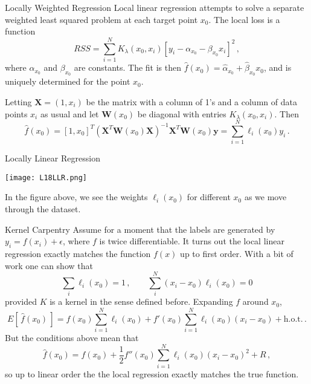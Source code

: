\documentclass[10pt, table, dvipsnames,xcdraw,handout]{beamer}
\newcommand{\bfX}{\ensuremath{\mathbf{X}}}
\newcommand{\bfy}{\ensuremath{\mathbf{y}}}
\begin{document}
\begin{frame}[fragile]{Locally Weighted Regression}
Local linear regression attempts to solve a separate weighted least squared problem at each target point $x_0$. The local loss is a function
$$
RSS = \sum_{i=1}^N K_\lambda(x_0,x_i)[y_i - \alpha_{x_0} - \beta_{x_0}x_i]^2\,,
$$\pause
where $\alpha_{x_0}$ and  $\beta_{x_0}$ are constants. \pause The fit is then $\hat{f}(x_0) = \hat{\alpha}_{x_0} + \hat{\beta}_{x_0}x_0$, and is uniquely determined for the point $x_0$. \pause

Letting $\mathbf{X} = (1,x_i)$ be the matrix with a column of 1's and a column of data points $x_i$ as usual and let $\mathbf{W}(x_0)$ be diagonal with entries $K_\lambda(x_0,x_i)$. Then
$$
\hat f(x_0) = [1,x_0]^T(\mathbf{X}^T\mathbf{W}(x_0)\mathbf{X})^{-1}\bfX^T\mathbf{W}(x_0) \bfy = \sum_{i=1}^N\ell_i(x_0)y_i\,.
$$
\end{frame}



\begin{frame}[fragile]{Locally Linear Regression}
  \begin{minipage}[t][0.5\textheight][t]{\textwidth}
	\centering \texttt{[image: L18LLR.png]} 
  \end{minipage}
  \vfill
\begin{minipage}[t][0.5\textheight][t]{\textwidth}
In the figure above, we see the weights $\ell_i(x_0)$ for different $x_0$ as we move through the dataset. 
\end{minipage}
\end{frame}



\begin{frame}[fragile]{Kernel Carpentry}
Assume for a moment that the labels are generated by $y_i = f(x_i)  + \epsilon$, where $f$ is twice differentiable. It turns out the local linear regression exactly matches the function $f(x)$ up to first order. \pause With a bit of work one can show that
$$
\sum_{i}\ell_i(x_0) = 1\,,\hspace{2em} \sum_i^N(x_i - x_0)\ell_i(x_0) = 0
$$
provided $K$ is a kernel in the sense defined before. \pause Expanding $f$ around $x_0$,
$$
E[\,\hat{f}(x_0) \,]= f(x_0)\sum_{i=1}^N\ell_i(x_0) + f'(x_0)\sum_{i=1}^N\ell_i(x_0) (x_i-x_0) + \text{h.o.t.}\,.
$$\pause
But the conditions above mean that 
$$
\hat{f}(x_0) = f(x_0) + \frac12f''(x_0)\sum_{i=1}^N\ell_i(x_0) (x_i-x_0) ^2 + R\,,
$$
so up to linear order the the local regression exactly matches the true function. 
\end{frame}
\end{document}
